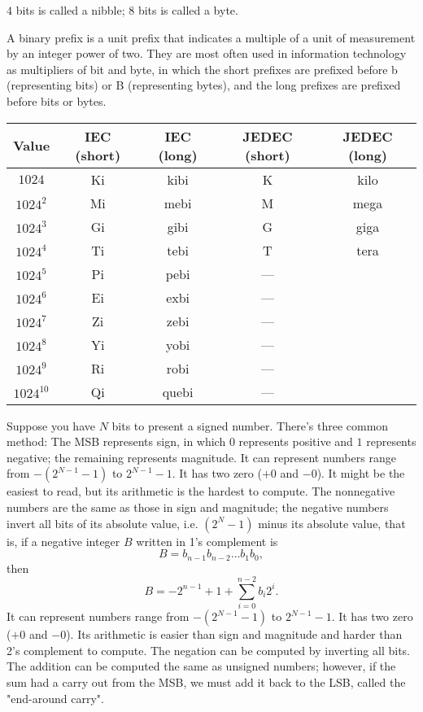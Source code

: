 \documentclass[a4paper,12pt]{report}
\begin{document}
$4$ bits is called a nibble; $8$ bits is called a byte.

A binary prefix is a unit prefix that indicates a multiple of a unit of measurement by an integer power of two. They are most often used in information technology as multipliers of bit and byte, in which the short prefixes are prefixed before b (representing bits) or B (representing bytes), and the long prefixes are prefixed before bits or bytes.
\begin{longtable}[c]{|c|c|c|c|c|}
\hline
Value & IEC (short) & IEC (long) & JEDEC (short) & JEDEC (long)\\\hline
$1024$ & Ki & kibi & K & kilo\\\hline
$1024^2$ & Mi & mebi & M & mega\\\hline
$1024^3$ & Gi & gibi & G & giga\\\hline
$1024^4$ & Ti & tebi & T & tera\\\hline
$1024^5$ & Pi & pebi & —\\\hline
$1024^6$ & Ei & exbi & —\\\hline
$1024^7$ & Zi & zebi & —\\\hline
$1024^8$ & Yi & yobi & —\\\hline
$1024^9$ & Ri & robi & —\\\hline
$1024^10$ & Qi & quebi & —\\\hline
\end{longtable}\FB
{}
Suppose you have $N$ bits to present a signed number. There's three common method:
The MSB represents sign, in which $0$ represents positive and $1$ represents negative; the remaining represents magnitude. 
It can represent numbers range from $-(2^{N-1}-1)$ to $2^{N-1}-1$. It has two zero ($+0$ and $-0$).
It might be the easiest to read, but its arithmetic is the hardest to compute.
The nonnegative numbers are the same as those in sign and magnitude; the negative numbers invert all bits of its absolute value, i.e. $(2^N-1)$ minus its absolute value, that is, if a negative integer $B$ written in 1's complement is
\[B=b_{n-1}b_{n-2}\ldots b_1b_0,\]
then
\[B=-2^{n-1}+1+\sum_{i=0}^{n-2}b_i2^i.\]
It can represent numbers range from $-(2^{N-1}-1)$ to $2^{N-1}-1$. It has two zero ($+0$ and $-0$). 
Its arithmetic is easier than sign and magnitude and harder than 2's complement to compute. 
The negation can be computed by inverting all bits.
The addition can be computed the same as unsigned numbers; however, if the sum had a carry out from the MSB, we must add it back to the LSB, called the "end-around carry".
\end{document}
